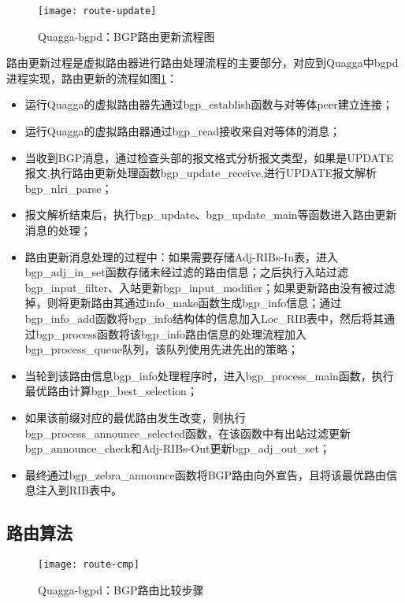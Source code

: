 \begin{figure}
  \centering
  \texttt{[image: route-update]}
  \caption{Quagga-bgpd：BGP路由更新流程图}
  \label{fig:route-update}
\end{figure}



路由更新过程是虚拟路由器进行路由处理流程的主要部分，对应到Quagga中bgpd进程实现，路由更新的流程如图\ref{fig:route-update}：
\begin{itemize}
  \item 运行Quagga的虚拟路由器先通过bgp\_establish函数与对等体peer建立连接；
  \item 运行Quagga的虚拟路由器通过bgp\_read接收来自对等体的消息；
  \item 当收到BGP消息，通过检查头部的报文格式分析报文类型，如果是UPDATE报文,执行路由更新处理函数bgp\_update\_receive,进行UPDATE报文解析bgp\_nlri\_parse；
  \item 报文解析结束后，执行bgp\_update、bgp\_update\_main等函数进入路由更新消息的处理；
  \item 路由更新消息处理的过程中：如果需要存储Adj-RIBs-In表，进入bgp\_adj\_in\_set函数存储未经过滤的路由信息；之后执行入站过滤bgp\_input\_filter、入站更新bgp\_input\_modifier；如果更新路由没有被过滤掉，则将更新路由其通过info\_make函数生成bgp\_info信息；通过bgp\_info\_add函数将bgp\_info结构体的信息加入Loc\_RIB表中，然后将其通过bgp\_process函数将该bgp\_info路由信息的处理流程加入bgp\_process\_queue队列，该队列使用先进先出的策略；
  \item 当轮到该路由信息bgp\_info处理程序时，进入bgp\_process\_main函数，执行最优路由计算bgp\_best\_selection；
  \item 如果该前缀对应的最优路由发生改变，则执行bgp\_process\_announce\_selected函数，在该函数中有出站过滤更新bgp\_announce\_check和Adj-RIBs-Out更新bgp\_adj\_out\_set；
  \item 最终通过bgp\_zebra\_announce函数将BGP路由向外宣告，且将该最优路由信息注入到RIB表中。
\end{itemize}

\subsection{路由算法}


\begin{figure}
  \centering
  \texttt{[image: route-cmp]}
  \caption{Quagga-bgpd：BGP路由比较步骤}
  \label{fig:route-cmp}
\end{figure}

